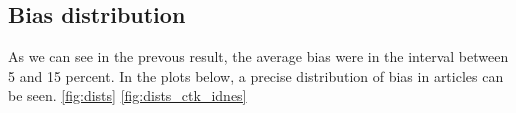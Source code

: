\begin{figure}[h]
\end{figure}



\tocless\subsection{Bias distribution}
As we can see in the prevous result, the average bias were in the interval between 5 and 15 percent. In the plots below, a precise distribution of bias in articles can be seen.
\ref{fig:dists}
\ref{fig:dists_ctk_idnes}

